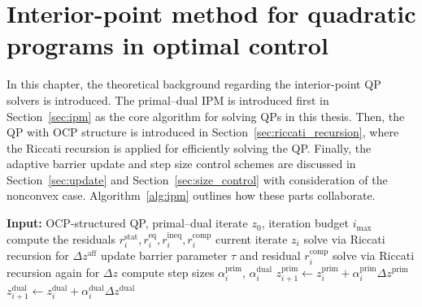 \documentclass[class=scrbook, crop=false]{standalone}
\begin{document}
\ifstandalone

    
\fi

\chapter{Interior-point method for quadratic programs in optimal control}
\label{Chapter::Theoretical_Background} %
In this chapter, the theoretical background regarding the interior-point \gls{QP} solvers is introduced.
The primal--dual \gls{IPM} is introduced first in Section~\ref{sec:ipm}
as the core algorithm for solving \glspl{QP} in this thesis.
Then, the \gls{QP} with \gls{OCP} structure is introduced in Section~\ref{sec:riccati_recursion},
where the Riccati recursion is applied for efficiently solving the \gls{QP}.
Finally, the adaptive barrier update and step size control schemes
are discussed in Section~\ref{sec:update} and Section~\ref{sec:size_control} 
with consideration of the nonconvex case. Algorithm~\ref{alg:ipm} outlines how these parts collaborate.
\begin{algorithm}[htbp]
\caption{Primal--dual \gls{IPM} for \glspl{QP} with \gls{OCP} structure}
\label{alg:ipm}
\begin{algorithmic}[1]
\State \textbf{Input:} \gls{OCP}-structured \gls{QP}, primal--dual iterate $z_0$, iteration budget $i_{\mathrm{max}}$
    \State compute the residuals $r_i^{\mathrm{stat}}, r_i^{\mathrm{eq}}, r_i^{\mathrm{ineq}}, r_i^{\mathrm{comp}}$ 
        \State \Return current iterate $z_i$
    \EndIf
    \State solve via Riccati recursion for $\Delta z^{\mathrm{aff}}$ 
    \State update barrier parameter $\tau$ and residual $r_i^{\mathrm{comp}}$ 
    \State solve via Riccati recursion again for $\Delta z$ 
    \State compute step sizes $\alpha_i^{\mathrm{prim}}$, $\alpha_i^{\mathrm{dual}}$ 
    \State $z_{i+1}^{\mathrm{prim}} \gets z_i^{\mathrm{prim}} + \alpha_i^{\mathrm{prim}} \Delta z^{\mathrm{prim}}$
    \State $z_{i+1}^{\mathrm{dual}} \gets z_i^{\mathrm{dual}} + \alpha_i^{\mathrm{dual}} \Delta z^{\mathrm{dual}}$
\EndFor
\end{algorithmic}
\end{algorithm}
\end{document}
